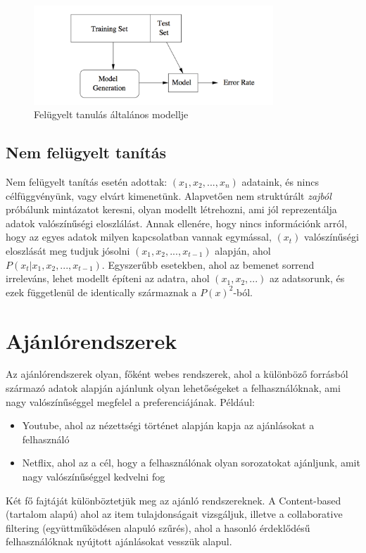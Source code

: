 \documentclass[a4paper,12pt]{article}
\begin{document}
\begin{figure}[ht!]
\centering
\includegraphics[width=90mm]{img/ml.png}
\caption{Felügyelt tanulás általános modellje \label{ml}}
\end{figure}

\subsection{Nem felügyelt tanítás}
Nem felügyelt tanítás esetén adottak: $(x_1, x_2, ..., x_n)$ adataink, és nincs célfüggvényünk, vagy elvárt kimenetünk. Alapvetően nem struktúrált \textsl{zajból} próbálunk mintázatot keresni, olyan modellt létrehozni, ami jól reprezentálja adatok valószínűségi eloszlálást. Annak ellenére, hogy nincs információnk arról, hogy az egyes adatok milyen kapcsolatban vannak egymással, $(x_t)$ valószínűségi eloszlását meg tudjuk jósolni  $(x_1,x_2, ..., x_{t-1})$ alapján, ahol $P(x_t|x_1,x_2, ..., x_{t-1})$.
Egyszerűbb esetekben, ahol az bemenet sorrend irreleváns, lehet modellt építeni az adatra, ahol $(x_1, x_2, ...)$ az adatsorunk, és ezek függetlenül de identically származnak a $P(x)^2$-ból.~\cite{unsupervised}

\section{Ajánlórendszerek}
Az ajánlórendszerek olyan, főként webes rendszerek, ahol a különböző forrásból származó adatok alapján ajánlunk olyan lehetőségeket a felhasználóknak, ami nagy valószínűséggel megfelel a preferenciájának. Például:
\begin{itemize}
\item Youtube, ahol az nézettségi történet alapján kapja az ajánlásokat a felhasználó
\item Netflix, ahol az a cél, hogy a felhasználónak olyan sorozatokat ajánljunk, amit nagy valószínűséggel kedvelni fog
\end{itemize}
Két fő fajtáját különböztetjük meg az ajánló rendszereknek. A Content-based (tartalom alapú) ahol az item tulajdonságait vizsgáljuk, illetve a collaborative filtering (együttműködésen alapuló szűrés), ahol a hasonló érdeklődésű felhasználóknak nyújtott ajánlásokat vesszük alapul. \linebreak
\end{document}
